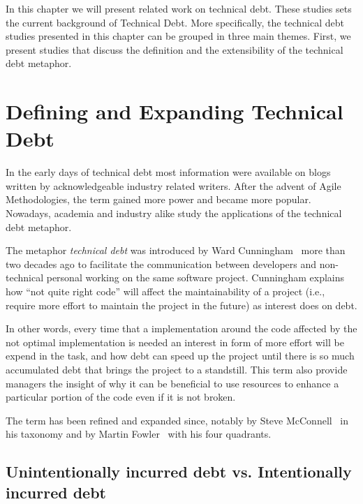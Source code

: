 
In this chapter we will present related work on technical debt. These studies sets the current background of Technical Debt. More specifically, the technical debt studies presented in this chapter can be grouped in three main themes. First, we present studies that discuss the definition and the extensibility of the technical debt metaphor. 

\section{Defining and Expanding Technical Debt}
\label{defining_and_extending_technical_debt}

In the early days of technical debt most information were available on blogs written by acknowledgeable industry related writers. After the advent of Agile Methodologies, the term gained more power and became more popular. Nowadays, academia and industry alike study the applications of the technical debt metaphor.

The metaphor \textit{technical debt} was introduced by Ward Cunningham~\cite{Cunningham1992WPM} more than two decades ago to facilitate the communication between developers and non-technical personal working on the same software project. Cunningham explains how ``not quite right code'' will affect the maintainability of a project (i.e., require more effort to maintain the project in the future) as interest does on debt. 

In other words, every time that a implementation around the code affected by the not optimal implementation is needed an interest in form of more effort will be expend in the task, and how debt can speed up the project until there is so much accumulated debt that brings the project to a standstill. This term also provide managers the insight of why it can be beneficial to use resources to enhance a particular portion of the code even if it is not broken.

The term has been refined and expanded since, notably by Steve McConnell~\cite{McConnell07:TechnicalDebt} in his taxonomy and by Martin Fowler~\cite{MartinFowler:TechnicalDebtQuadrant} with his four quadrants. 

\subsection{Unintentionally incurred debt vs. Intentionally incurred debt}

